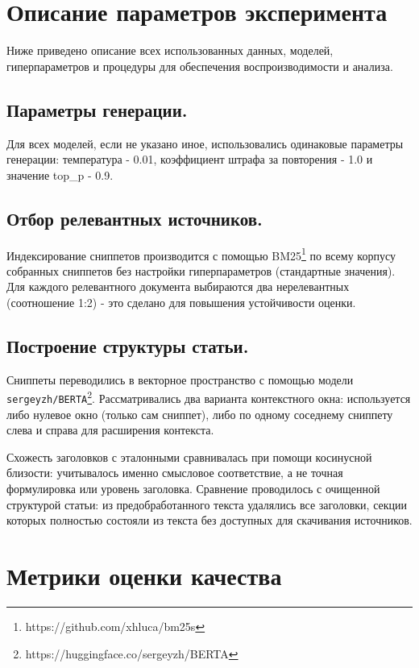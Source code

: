 \documentclass{article}
\begin{document}
\section*{Описание параметров эксперимента}
Ниже приведено описание всех использованных данных, моделей, гиперпараметров и процедуры для обеспечения воспроизводимости и анализа.

\subsection*{Параметры генерации.}
Для всех моделей, если не указано иное, использовались одинаковые параметры генерации: температура - 0.01, коэффициент штрафа за повторения - 1.0 и значение top\_p - 0.9.

\subsection*{Отбор релевантных источников.}
Индексирование сниппетов производится с помощью BM25\footnote{https://github.com/xhluca/bm25s} по всему корпусу собранных сниппетов без настройки гиперпараметров (стандартные значения).
Для каждого релевантного документа выбираются два нерелевантных (соотношение 1:2) - это сделано для повышения устойчивости оценки.

\subsection*{Построение структуры статьи.}
Сниппеты переводились в векторное пространство с помощью модели \texttt{sergeyzh/BERTA}\footnote{https://huggingface.co/sergeyzh/BERTA}. 
Рассматривались два варианта контекстного окна: используется либо нулевое окно (только сам сниппет), либо по одному соседнему сниппету слева и справа для расширения контекста.  

Схожесть заголовков с эталонными сравнивалась при помощи косинусной близости: учитывалось именно смысловое соответствие, а не точная формулировка или уровень заголовка. 
Сравнение проводилось с очищенной структурой статьи: из предобработанного текста удалялись все заголовки, секции которых полностью состояли из текста без доступных для скачивания источников. 

\section*{Метрики оценки качества}
\end{document}

